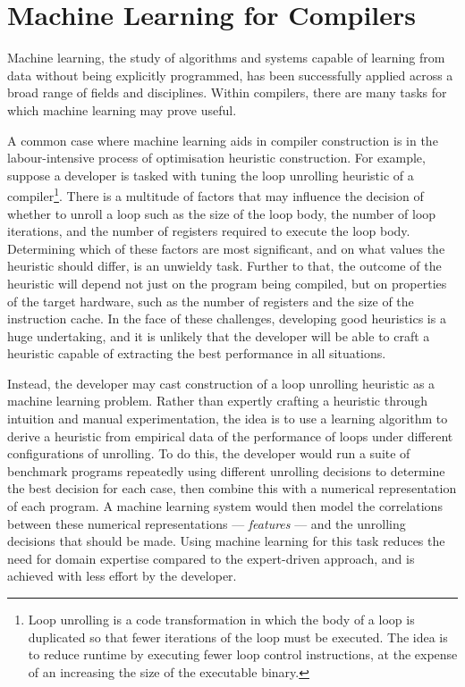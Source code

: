 \section{Machine Learning for Compilers}

Machine learning, the study of algorithms and systems capable of learning from data without being explicitly programmed, has been successfully applied across a broad range of fields and disciplines. Within compilers, there are many tasks for which machine learning may prove useful.

A common case where machine learning aids in compiler construction is in the labour-intensive process of optimisation heuristic construction. For example, suppose a developer is tasked with tuning the loop unrolling heuristic of a compiler\footnote{Loop unrolling is a code transformation in which the body of a loop is duplicated so that fewer iterations of the loop must be executed. The idea is to reduce runtime by executing fewer loop control instructions, at the expense of an increasing the size of the executable binary.}. There is a multitude of factors that may influence the decision of whether to unroll a loop such as the size of the loop body, the number of loop iterations, and the number of registers required to execute the loop body. Determining which of these factors are most significant, and on what values the heuristic should differ, is an unwieldy task. Further to that, the outcome of the heuristic will depend not just on the program being compiled, but on properties of the target hardware, such as the number of registers and the size of the instruction cache. In the face of these challenges, developing good heuristics is a huge undertaking, and it is unlikely that the developer will be able to craft a heuristic capable of extracting the best performance in all situations.

Instead, the developer may cast construction of a loop unrolling heuristic as a machine learning problem. Rather than expertly crafting a heuristic through intuition and manual experimentation, the idea is to use a learning algorithm to derive a heuristic from empirical data of the performance of loops under different configurations of unrolling. To do this, the developer would run a suite of benchmark programs repeatedly using different unrolling decisions to determine the best decision for each case, then combine this with a numerical representation of each program. A machine learning system would then model the correlations between these numerical representations --- \emph{features} --- and the unrolling decisions that should be made. Using machine learning for this task reduces the need for domain expertise compared to the expert-driven approach, and is achieved with less effort by the developer.

